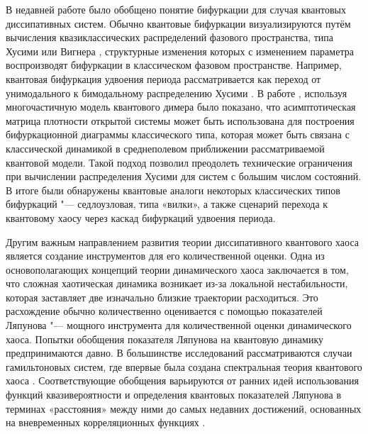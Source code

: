 В недавней работе \cite{Ivanchenko2017} было обобщено понятие бифуркации для случая квантовых диссипативных систем.
Обычно квантовые бифуркации визуализируются путём вычисления квазиклассических распределений фазового пространства, типа Хусими или Вигнера \cite{Stockmann2006}, структурные изменения которых с изменением параметра воспроизводят бифуркации в классическом фазовом пространстве. 
Например, квантовая бифуркация удвоения периода рассматривается как переход от унимодального к бимодальному распределению Хусими \cite{Hartmann2017, Wang2018}.
В работе \cite{Ivanchenko2017}, используя многочастичную модель квантового димера было показано, что асимптотическая матрица плотности открытой системы может быть использована для построения бифуркационной диаграммы классического типа, которая может быть связана с классической динамикой в среднеполевом приближении рассматриваемой квантовой модели.
Такой подход позволил преодолеть технические ограничения при вычислении распределения Хусими для систем с большим числом состояний.
В итоге были обнаружены квантовые аналоги некоторых классических типов бифуркаций "--- седлоузловая, типа «вилки», а также сценарий перехода к квантовому хаосу через каскад бифуркаций удвоения периода.

Другим важным направлением развития теории диссипативного квантового хаоса является создание инструментов для его количественной оценки.
Одна из основополагающих концепций теории динамического хаоса заключается в том, что сложная хаотическая динамика возникает из-за локальной нестабильности, которая заставляет две изначально близкие траектории расходиться. 
Это расхождение обычно количественно оценивается с помощью показателей Ляпунова "--- мощного инструмента для количественной оценки динамического хаоса.
Попытки обобщения показателя Ляпунова на квантовую динамику предпринимаются давно. 
В большинстве исследований рассматриваются случаи гамильтоновых систем, где впервые была создана спектральная теория квантового хаоса \cite{Haake2018}.
Соответствующие обобщения варьируются от ранних идей использования функций квазивероятности и определения квантовых показателей Ляпунова в терминах «расстояния» между ними \cite{Toda1987, Haake1992, Manko2000} до самых недавних достижений, основанных на вневременных корреляционных функциях \cite{Rozenbaum2017, Liao2018, ChavezCarlos2019}.

